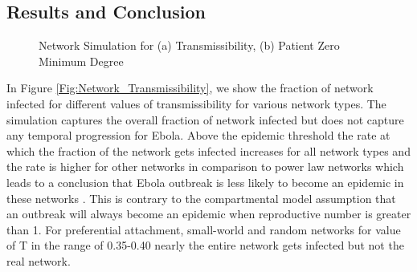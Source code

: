 \documentclass[10pt, journal,onecolumn]{IEEEtran}
\begin{document}
\subsection{{Results and Conclusion}}

\begin{figure}[ht]
\centering
{}
\quad
{}
\caption{Network Simulation for (a) Transmissibility, (b) Patient Zero Minimum Degree}
\end{figure}

In Figure  \ref{Fig:Network_Transmissibility}, we show the fraction of network infected for
different values of transmissibility for  various network types.  The simulation captures the
overall fraction of network infected  but does not capture any temporal progression for Ebola. Above
the epidemic threshold the rate at which the  fraction of the network gets infected increases for
all network types and the rate is higher for other networks in comparison to power law networks
which leads to a conclusion that Ebola outbreak is less likely to become an epidemic in these
networks . This is contrary to the compartmental model assumption that an outbreak will always
become an epidemic when reproductive number is greater than 1. For preferential attachment,
small-world and random networks for value of T in the range of 0.35-0.40 nearly the entire network
gets infected but not the real network.
\end{document}
